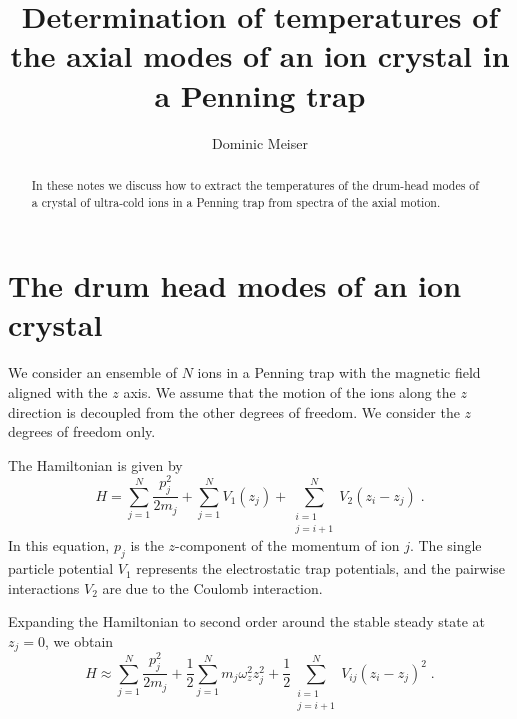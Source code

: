 \documentclass[aps, pra, preprint]{revtex4-1}
\begin{document}
\title{Determination of temperatures of the axial modes of an ion
  crystal in a Penning trap}
\author{Dominic Meiser}

\begin{abstract}
  In these notes we discuss how to extract the temperatures of
  the drum-head modes of a crystal of ultra-cold ions in a
  Penning trap from spectra of the axial motion.
\end{abstract}

\maketitle


\section{The drum head modes of an ion crystal}

We consider an ensemble of $N$ ions in a Penning trap with the
magnetic field aligned with the $z$ axis. We assume that the
motion of the ions along the $z$ direction is decoupled from the
other degrees of freedom. We consider the $z$ degrees of
freedom only.

The Hamiltonian is given by
\begin{equation}
  H=
    \sum_{j=1}^N\frac{p_j^2}{2m_j} +
    \sum_{j=1}^NV_1(z_j) +
    \sum_{\substack{i=1\\j = i + 1}}^{N}V_2(z_i - z_j)\;.
\end{equation}
In this equation, $p_j$ is the $z$-component of the momentum of
ion $j$. The single particle potential $V_1$ represents the
electrostatic trap potentials, and the pairwise interactions
$V_2$ are due to the Coulomb interaction. 

Expanding the Hamiltonian to second order around the stable
steady state at $z_j=0$, we obtain
\begin{equation}
  H\approx 
    \sum_{j=1}^N \frac{p_j^2}{2m_j} +
    \frac{1}{2}\sum_{j=1}^N m_j \omega_z^2 z_j^2+
    \frac{1}{2}\sum_{\substack{i = 1\\j = i + 1}}^{N} V_{ij}(z_i-z_j)^2\;.
\end{equation}
\end{document}
